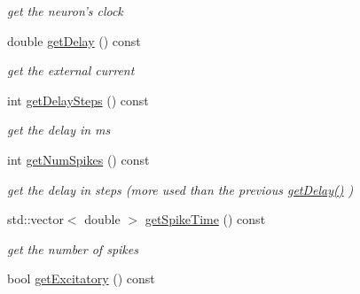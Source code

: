 \begin{DoxyCompactItemize}
\begin{DoxyCompactList}\small\item\em get the neuron's clock \end{DoxyCompactList}\item 
\hypertarget{classNeuron_ad87cfbd4f9f22155180692a2743a3618}{double \hyperlink{classNeuron_ad87cfbd4f9f22155180692a2743a3618}{get\-Delay} () const }\label{classNeuron_ad87cfbd4f9f22155180692a2743a3618}

\begin{DoxyCompactList}\small\item\em get the external current \end{DoxyCompactList}\item 
\hypertarget{classNeuron_a8246b1d18d686f5eac06e0df4133c73a}{int \hyperlink{classNeuron_a8246b1d18d686f5eac06e0df4133c73a}{get\-Delay\-Steps} () const }\label{classNeuron_a8246b1d18d686f5eac06e0df4133c73a}

\begin{DoxyCompactList}\small\item\em get the delay in ms \end{DoxyCompactList}\item 
\hypertarget{classNeuron_ac8170288ad54439daa39dda3d09530a6}{int \hyperlink{classNeuron_ac8170288ad54439daa39dda3d09530a6}{get\-Num\-Spikes} () const }\label{classNeuron_ac8170288ad54439daa39dda3d09530a6}

\begin{DoxyCompactList}\small\item\em get the delay in steps (more used than the previous \hyperlink{classNeuron_ad87cfbd4f9f22155180692a2743a3618}{get\-Delay()} ) \end{DoxyCompactList}\item 
\hypertarget{classNeuron_a5df25701576fd73b2352bf0e594c21bd}{std\-::vector$<$ double $>$ \hyperlink{classNeuron_a5df25701576fd73b2352bf0e594c21bd}{get\-Spike\-Time} () const }\label{classNeuron_a5df25701576fd73b2352bf0e594c21bd}

\begin{DoxyCompactList}\small\item\em get the number of spikes \end{DoxyCompactList}\item 
\hypertarget{classNeuron_a185f67cb52f92805222fcef8e8236e43}{bool \hyperlink{classNeuron_a185f67cb52f92805222fcef8e8236e43}{get\-Excitatory} () const }\label{classNeuron_a185f67cb52f92805222fcef8e8236e43}


\end{DoxyCompactItemize}
